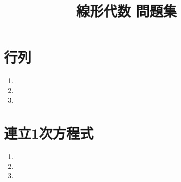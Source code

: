\documentclass[11pt, uplatex, dvipdfmx, twoside]{jsarticle}
\title{\Huge 線形代数 問題集}
\begin{document}
\maketitle
\thispagestyle{empty}

\newpage

\section{行列}\label{sec:matrix}

\begin{enumerate}[label=\ref{sec:matrix}.\arabic*]
  \setlength{\itemsep}{1zh}
  
\item

\item

\item

\end{enumerate}

\section{連立1次方程式}\label{sec:system}

\begin{enumerate}[label=\ref{sec:system}.\arabic*]
  \setlength{\itemsep}{1zh}
\item

\item

\item
  
\end{enumerate}
\end{document}
